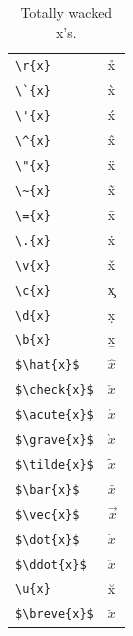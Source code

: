 ﻿\documentclass{article}
\begin{document}
\begin{table}
\begin{center}
\begin{tabular}{ll}
\verb#\r{x}#& \r{x}\\
\verb#\`{x}#& \`{x}\\
\verb#\'{x}#& \'{x}\\
\verb#\^{x}#& \^{x}\\
\verb#\"{x}#& \"{x}\\
\verb#\~{x}#& \~{x}\\
\verb#\={x}#& \={x}\\
\verb#\.{x}#& \.{x}\\
\verb#\v{x}#& \v{x}\\
\verb#\c{x}#& \c{x}\\
\verb#\d{x}#& \d{x}\\
\verb#\b{x}#& \b{x}\\
\verb#$\hat{x}$#& $\hat{x}$\\
\verb#$\check{x}$#& $\check{x}$\\
\verb#$\acute{x}$#& $\acute{x}$\\
\verb#$\grave{x}$#& $\grave{x}$\\
\verb#$\tilde{x}$#& $\tilde{x}$\\
\verb#$\bar{x}$#& $\bar{x}$\\
\verb#$\vec{x}$#& $\vec{x}$\\
\verb#$\dot{x}$#& $\dot{x}$\\
\verb#$\ddot{x}$#& $\ddot{x}$\\
\verb#\u{x}#& \u{x}\\
\verb#$\breve{x}$#& $\breve{x}$
\end{tabular}
\caption{Totally wacked x's.}
\end{center}
\end{table}
\pagebreak
\end{document}
